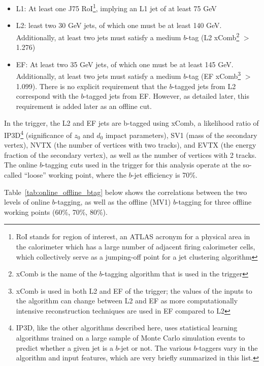 \begin{itemize}
    \item L1: At least one J75 RoI\footnote{RoI stands for region of interest, an ATLAS acronym
    for a physical area in the calorimeter which has a large number of adjacent firing calorimeter
    cells, which collectively serve as a jumping-off point for a jet clustering algorithm}, implying an L1 jet of at least 75 GeV
    \item L2: least two 30 GeV jets, of which one must be at least 140 GeV. Additionally, at least two
jets must satisfy a medium $b$-tag (L2 xComb\footnote{xComb is the name of the $b$-tagging algorithm
that is used in the trigger} $>$ 1.276)
    \item EF: At least two 35 GeV jets, of which one must be at least 145 GeV. Additionally, at least two
jets must satisfy a medium $b$-tag (EF xComb\footnote{xComb is used in both L2 and EF of the trigger;
the values of the inputs to the algorithm can change between L2 and EF as more computationally intensive
reconstruction techniques are used in EF compared to L2} $>$ 1.099). There is no explicit requirement that the
$b$-tagged jets from L2 correspond with the $b$-tagged jets from EF. However, as detailed later, this
requirement is added later as an offline cut.
\end{itemize}


In the trigger, the L2 and EF jets are b-tagged using xComb, a likelihood ratio of IP3D\footnote{IP3D, like
the other algorithms described here, uses statistical learning algorithms trained on a large sample
of Monte Carlo simulation events to predict whether a given jet is a $b$-jet or not.  The various $b$-taggers
vary in the algorithm and input features, which are very briefly summarized in this list. } 
(significance of $z_0$ and $d_0$ impact parameters), SV1 (mass of the secondary vertex), NVTX (the number of
vertices with two tracks), and EVTX (the energy fraction of the secondary vertex), as well as the number
of vertices with 2 tracks. 
The online $b$-tagging cuts used in the trigger for this analysis operate at the so-called ``loose''
working point, where the $b$-jet efficiency
is 70\%.

Table~\ref{tab:online_offline_btag} below shows the correlations between the two levels of online
$b$-tagging, as well as the offline (MV1) $b$-tagging for three offline working points (60\%, 70\%,
80\%).  

